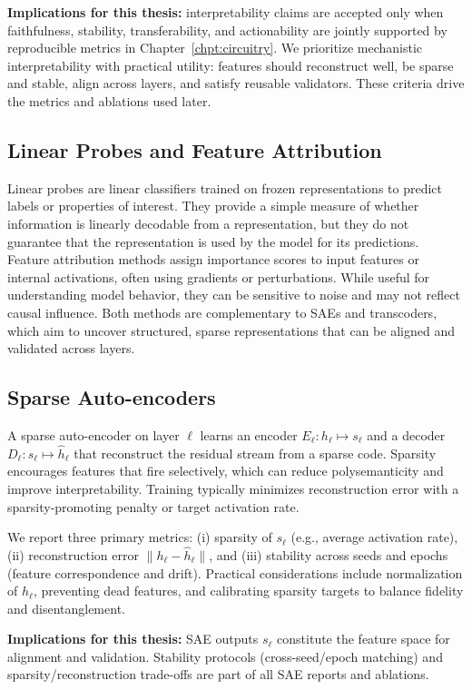 \documentclass[../ppgc-tese.tex]{subfiles}
\begin{document}
\textbf{Implications for this thesis:} interpretability claims are accepted only when faithfulness, stability, transferability, and actionability are jointly supported by reproducible metrics in Chapter~\ref{chpt:circuitry}.
We prioritize mechanistic interpretability with practical utility: features should reconstruct well, be sparse and stable, align across layers, and satisfy reusable validators. These criteria drive the metrics and ablations used later.

\subsection{Linear Probes and Feature Attribution}
Linear probes are linear classifiers trained on frozen representations to predict labels or properties of interest. They provide a simple measure of whether information is linearly decodable from a representation, but they do not guarantee that the representation is used by the model for its predictions. Feature attribution methods assign importance scores to input features or internal activations, often using gradients or perturbations. While useful for understanding model behavior, they can be sensitive to noise and may not reflect causal influence. Both methods are complementary to SAEs and transcoders, which aim to uncover structured, sparse representations that can be aligned and validated across layers.

\subsection{Sparse Auto-encoders}
A sparse auto-encoder on layer $\ell$ learns an encoder $E_\ell: h_\ell\mapsto s_\ell$ and a decoder $D_\ell: s_\ell\mapsto \hat h_\ell$ that reconstruct the residual stream from a sparse code. Sparsity encourages features that fire selectively, which can reduce polysemanticity and improve interpretability. Training typically minimizes reconstruction error with a sparsity-promoting penalty or target activation rate.

We report three primary metrics: (i) sparsity of $s_\ell$ (e.g., average activation rate), (ii) reconstruction error $\|h_\ell-\hat h_\ell\|$, and (iii) stability across seeds and epochs (feature correspondence and drift). Practical considerations include normalization of $h_\ell$, preventing dead features, and calibrating sparsity targets to balance fidelity and disentanglement.

\textbf{Implications for this thesis:} SAE outputs $s_\ell$ constitute the feature space for alignment and validation. Stability protocols (cross-seed/epoch matching) and sparsity\slash reconstruction trade-offs are part of all SAE reports and ablations.
\end{document}

